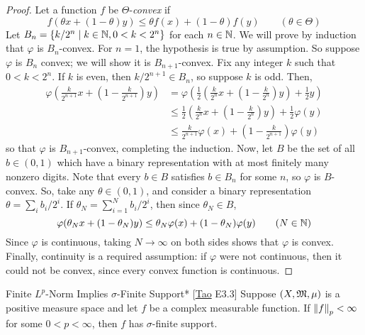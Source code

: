 \begin{proof}
    Let a function \(f\) be \(\Theta\)-\emph{convex} if 
    \[
        f(\theta x + (1 - \theta) y) \leq \theta f(x) + (1 - \theta) f(y) 
        \qquad (\theta \in \Theta)
    \]
    Let \(B_n = \{k / 2^n \mid k \in \mathbb{N}, 0 < k < 2^n\}\) for each \(n \in \mathbb{N}\). We will prove by induction that \(\varphi\) is \(B_n\)-convex. For \(n=1\), the hypothesis is true by assumption. So suppose \(\varphi\) is \(B_n\) convex; we will show it is \(B_{n+1}\)-convex. Fix any integer \(k\) such that \(0 < k < 2^n\). If \(k\) is even, then \(k/2^{n+1} \in B_n\), so suppose \(k\) is odd. Then, 
    \begin{align*}
        \varphi \left( \frac{k}{2^{n+1}} x + \left(1 - \frac{k}{2^{n+1}}\right) y \right)
        &= \varphi \left( \frac{1}{2} \left( \frac{k}{2^n} x + \left(1 - \frac{k}{2^n}\right) y \right) + \frac{1}{2} y \right) \\
        &\leq \frac{1}{2} \left( \frac{k}{2^n} x + \left( 1 - \frac{k}{2^n} \right) y \right) + \frac{1}{2} \varphi(y) \\
        &\leq \frac{k}{2^{n+1}} \varphi(x) + \left(1 - \frac{k}{2^{n+1}} \right) \varphi(y)
    \end{align*}
    so that \(\varphi\) is \(B_{n+1}\)-convex, completing the induction. Now, let \(B\) be the set of all \(b \in (0, 1)\) which have a binary representation with at most finitely many nonzero digits. Note that every \(b \in B\) satisfies \(b \in B_n\) for some \(n\), so \(\varphi\) is \(B\)-convex. So, take any \(\theta \in (0, 1)\), and consider a binary representation \(\theta = \sum_i b_i / 2^i\). If \(\theta_N = \sum_{i=1}^N b_i / 2^i\), then since \(\theta_N \in B\), 
    \[
        \varphi(\theta_N x + (1 - \theta_N) y) \leq \theta_N \varphi(x) + (1 - \theta_N) \varphi(y)
        \qquad (N \in \mathbb{N})
    \]
    Since \(\varphi\) is continuous, taking \(N \to \infty\) on both sides shows that \(\varphi\) is convex. Finally, continuity is a required assumption: if \(\varphi\) were not continuous, then it could not be convex, since every convex function is continuous. 
\end{proof}


\begin{problem}{Finite \(L^p\)-Norm Implies \(\sigma\)-Finite Support}*
    [\href{https://terrytao.wordpress.com/2009/01/09/245b-notes-3-lp-spaces/}{Tao} E3.3] Suppose \((X, \mathfrak{M}, \mu)\) is a positive measure space and let \(f\) be a complex measurable function. If \(\norm{f}_p < \infty\) for some \(0 < p < \infty\), then \(f\) has \(\sigma\)-finite support. 
\end{problem}

